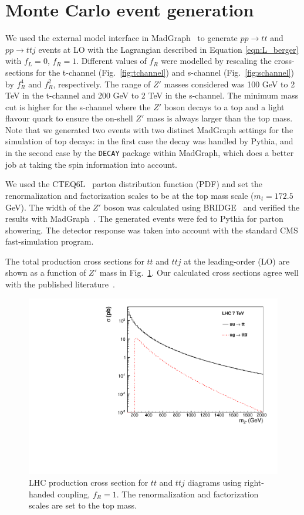 \section{Monte Carlo event generation}
\label{sec:mc}

We used the external model interface in MadGraph~\cite{madgraph} 
to generate $pp \to tt$ and $pp \to ttj$ events at LO 
with the Lagrangian described in Equation \ref{eqn:L_berger} with $f_L = 0$, $f_R = 1$.  
Different values of $f_R$ were modelled by rescaling the cross-sections
for the t-channel (Fig.~\ref{fig:tchannel}) and s-channel (Fig.~\ref{fig:schannel}) 
by $f_R^4$ and $f_R^2$, respectively.
The range of $Z'$ masses considered was 100 GeV to 2 TeV in the t-channel
and 200 GeV to 2 TeV in the s-channel. 
The minimum mass cut is higher for the s-channel where
the $Z'$ boson decays to a top and a light flavour quark
to ensure the on-shell $Z'$ mass is always  larger than the top mass.
Note that we generated two events with two distinct MadGraph settings for
the simulation of top decays: in the first case the decay was handled 
by Pythia, and in the second case by the {\tt DECAY} package within
MadGraph, which does a better job at taking the spin information into
account.

We used the CTEQ6L~\cite{cteq6l} parton distribution function (PDF)
and set the renormalization and factorization scales
to be at the top mass scale ($m_{t} = 172.5$ GeV). 
The width of the $Z'$ boson was calculated using 
BRIDGE~\cite{bridge} and verified the results with MadGraph~\cite{madgraph}. 
The generated events were fed to Pythia for 
parton showering.
The detector response was taken into account with the standard CMS
fast-simulation program.

The total production cross sections for $tt$ and $ttj$ 
at the leading-order (LO) are shown as a function of $Z'$ 
mass in Fig.~\ref{fig:sstopcross}. 
Our calculated cross sections agree well with the 
published literature~\cite{berger}. 

\begin{figure}[htb]
\begin{center}
\includegraphics[width=0.7\linewidth]{figs/sstopcross.pdf}
\caption{ LHC production cross section for $tt$ and $ttj$ diagrams using right-handed coupling, $f_R = 1$. 
The renormalization and factorization scales are set to the top mass. \label{fig:sstopcross}}
\end{center}
\end{figure}